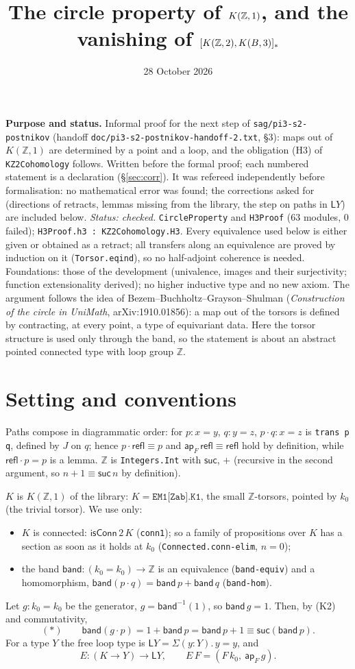 \documentclass[11pt]{amsart}
\title{The circle property of $K(\Z,1)$, and the vanishing of $[K(\Z,2),K(B,3)]_*$}
\date{28 October 2026}
\theoremstyle{definition}
\theoremstyle{remark}
\newcommand{\Z}{\mathbb{Z}}
\newcommand{\code}[1]{\texttt{#1}}
\newcommand{\cC}{\mathsf{isConn}}
\newcommand{\band}{\mathsf{band}}
\newcommand{\Lp}{\mathsf{L}}
\newcommand{\cc}{\cdot}
\begin{document}
\maketitle

\noindent\textbf{Purpose and status.} Informal proof for the next step of
\code{sag/pi3-s2-postnikov} (handoff \code{doc/pi3-s2-postnikov-handoff-2.txt},
\S3): maps out of $K(\Z,1)$ are determined by a point and a loop, and
the obligation (H3) of \code{KZ2Cohomology} follows. Written before the
formal proof; each numbered statement is a declaration
(\S\ref{sec:corr}). It was refereed independently before formalisation: no
mathematical error was found; the corrections asked for (directions of
retracts, lemmas missing from the library, the step on paths in $\Lp Y$)
are included below. \emph{Status: checked.} \code{CircleProperty} and
\code{H3Proof} (63 modules, 0 failed); \code{H3Proof.h3 : KZ2Cohomology.H3}.
Every equivalence used below is either given or obtained as a retract; all
transfers along an equivalence are proved by induction on it
(\code{Torsor.eqind}), so no half-adjoint coherence is needed. Foundations:
those of the development (univalence, images and their surjectivity;
function extensionality derived); no higher inductive type and no new
axiom. The argument follows the idea of Bezem--Buchholtz--Grayson--Shulman
(\emph{Construction of the circle in UniMath}, arXiv:1910.01856): a map out
of the torsors is defined by contracting, at every point, a type of
equivariant data. Here the torsor structure is used only through the
band, so the statement is about an abstract pointed connected type with
loop group $\Z$.

\section{Setting and conventions}

Paths compose in diagrammatic order: for $p:x=y$, $q:y=z$,
$p\cc q:x=z$ is \code{trans p q}, defined by $J$ on $q$; hence
$p\cc\mathsf{refl}\equiv p$ and $\mathsf{ap}_F\,\mathsf{refl}\equiv\mathsf{refl}$
hold by definition, while $\mathsf{refl}\cc p=p$ is a lemma.
$\Z$ is \code{Integers.Int} with $\mathsf{suc}$, $+$ (recursive in the
second argument, so $n+1\equiv\mathsf{suc}\,n$ by definition).

$K$ is $K(\Z,1)$ of the library: $K=\code{EM1[Zab].K1}$, the small
$\Z$-torsors, pointed by $k_0$ (the trivial torsor). We use only:
\begin{itemize}
\item[(K1)] $K$ is connected: $\cC\,2\,K$ (\code{conn1}); so a family of
  propositions over $K$ has a section as soon as it holds at $k_0$
  (\code{Connected.conn-elim}, $n=0$);
\item[(K2)] the band $\band:(k_0=k_0)\to\Z$ is an equivalence
  (\code{band-equiv}) and a homomorphism,
  $\band(p\cc q)=\band\,p+\band\,q$ (\code{band-hom}).
\end{itemize}
Let $g:k_0=k_0$ be the generator, $g=\band^{-1}(1)$, so $\band\,g=1$.
Then, by (K2) and commutativity,
\[(\ast)\qquad \band(g\cc p)=1+\band\,p=\band\,p+1\equiv\mathsf{suc}(\band\,p).\]
For a type $Y$ the free loop type is $\Lp Y=\Sigma(y:Y).\,y=y$, and
\[E:(K\to Y)\to\Lp Y,\qquad E\,F=(F\,k_0,\ \mathsf{ap}_F\,g).\]
\end{document}
